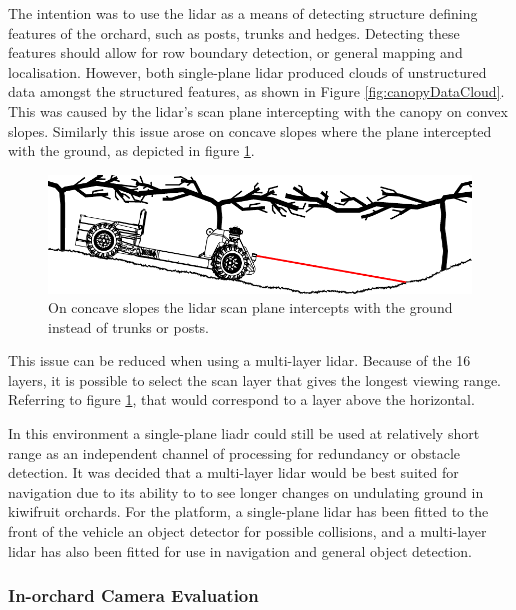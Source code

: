 \documentclass[preprint,authoryear,12pt]{elsarticle}
\begin{document}
        The intention was to use the lidar as a means of detecting structure defining features of the orchard, such as posts, trunks and hedges.
        Detecting these features should allow for row boundary detection, or general mapping and localisation.
        However, both single-plane lidar produced clouds of unstructured data amongst the structured features, as shown in Figure \ref{fig:canopyDataCloud}.
        This was caused by the lidar's scan plane intercepting with the canopy on convex slopes.
        Similarly this issue arose on concave slopes where the plane intercepted with the ground, as depicted in figure \ref{fig:concaveSlope}.

        \begin{figure}[htb]
            \centering
            \includegraphics[width=\linewidth]{imgs/concave_slope/concave_slope_v4.pdf}
            \caption{
                On concave slopes the lidar scan plane intercepts with the ground instead of trunks or posts.
            }
            \label{fig:concaveSlope}
        \end{figure}

        This issue can be reduced when using a multi-layer lidar.
        Because of the 16 layers, it is possible to select the scan layer that gives the longest viewing range.
        Referring to figure \ref{fig:concaveSlope}, that would correspond to a layer above the horizontal.

        In this environment a single-plane liadr could still be used at relatively short range as an independent channel of processing for redundancy or obstacle detection.
        It was decided that a multi-layer lidar would be best suited for navigation due to its ability to to see longer changes on undulating ground in kiwifruit orchards.
        For the platform, a single-plane lidar has been fitted to the front of the vehicle an object detector for possible collisions, and a multi-layer lidar has also been fitted for use in navigation and general object detection.


    \subsubsection{In-orchard Camera Evaluation}
        \label{sect:camera_evaluation}
\end{document}
